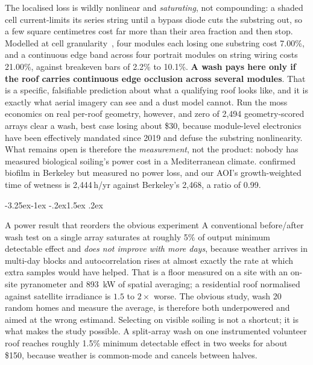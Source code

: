 \documentclass[10pt,twocolumn]{article}
\makeatletter
\renewcommand\subsection{\@startsection{subsection}{2}{\z@}%
  {-3.25ex\@plus -1ex \@minus -.2ex}{1.5ex \@plus .2ex}%
  {\normalfont\large\bfseries\raggedright}}
\makeatother
\begin{document}
The localised loss is wildly nonlinear and \emph{saturating}, not compounding: a shaded
cell current-limits its series string until a bypass diode cuts the substring out, so a
few square centimetres cost far more than their area fraction and then stop. Modelled at
cell granularity~\cite{bishop1988,holmgren2018pvlib}, four modules each losing one
substring cost 7.00\%, and a continuous edge band across four portrait modules on
string wiring costs 21.00\%, against breakeven bars of 2.2\% to 10.1\%. \textbf{A wash pays
here only if the roof carries continuous edge occlusion across several modules}. That is a
specific, falsifiable prediction about what a qualifying roof looks like, and it is
exactly what aerial imagery can see and a dust model cannot. Run the moss economics on
real per-roof geometry, however, and zero of 2{,}494
geometry-scored arrays clear a wash, best case losing about \$30, because module-level
electronics have been effectively mandated since 2019 and defuse the substring
nonlinearity. What remains
open is therefore the \emph{measurement}, not the product: nobody has measured biological
soiling's power cost in a Mediterranean climate. \citet{porcar2018} confirmed biofilm in
Berkeley but measured no power loss, and our AOI's growth-weighted time of wetness is
2{,}444\,h/yr against Berkeley's 2{,}468, a ratio of 0.99.

\subsection{A power result that reorders the obvious experiment}
A conventional before/after wash test on a single array saturates at roughly 5\% of output
minimum detectable effect and \emph{does not improve with more days}, because weather
arrives in multi-day blocks and autocorrelation rises at almost exactly the rate at which
extra samples would have helped. That is a floor measured on a site with an on-site pyranometer
and \SI{893}{\kilo\watt} of spatial averaging; a residential roof normalised against
satellite irradiance is $1.5$ to $2\times$ worse. The obvious study, wash 20 random homes and measure the average, is therefore both
underpowered and aimed at the wrong estimand. Selecting on visible soiling is not a shortcut; it is what makes the study
possible. A split-array wash on one instrumented volunteer roof reaches roughly 1.5\%
minimum detectable effect in two weeks for about \$150, because weather is common-mode and
cancels between halves.
\end{document}
